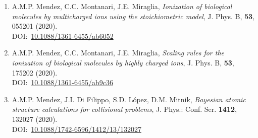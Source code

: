 \begin{enumerate}
\item
A.M.P. Mendez, C.C. Montanari, J.E. Miraglia,
\textit{Ionization of biological molecules by multicharged ions using the stoichiometric model},
J. Phys. B, \textbf{53}, 055201 (2020). \\
DOI:~\href{http://www.doi.org/10.1088/1361-6455/ab6052}{10.1088/1361-6455/ab6052}

\item
A.M.P. Mendez, C.C. Montanari, J.E. Miraglia,
\textit{Scaling rules for the ionization of biological molecules by highly charged ions},
J. Phys. B, \textbf{53}, 175202 (2020). \\
DOI:~\href{http://www.doi.org/10.1088/1361-6455/ab9c36}{10.1088/1361-6455/ab9c36}

\item
A.M.P. Mendez, J.I. Di Filippo, S.D. López, D.M. Mitnik,
\textit{Bayesian atomic structure calculations for collisional problems},
J. Phys.: Conf. Ser. \textbf{1412}, 132027 (2020). \\
DOI:~\href{http://www.doi.org/10.1088/1742-6596/1412/13/132027}{10.1088/1742-6596/1412/13/132027}

\end{enumerate}

